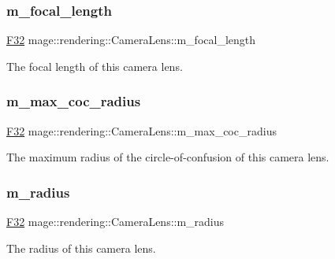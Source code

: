 \subsubsection{\texorpdfstring{m\+\_\+focal\+\_\+length}{m\_focal\_length}}
{\footnotesize\ttfamily \hyperlink{namespacemage_aa97e833b45f06d60a0a9c4fc22ae02c0}{F32} mage\+::rendering\+::\+Camera\+Lens\+::m\+\_\+focal\+\_\+length\hspace{0.3cm}{\ttfamily [private]}}

The focal length of this camera lens. \hypertarget{classmage_1_1rendering_1_1_camera_lens_a5c7880aabfbe08addb1fcaf9ac5ff940}{}\label{classmage_1_1rendering_1_1_camera_lens_a5c7880aabfbe08addb1fcaf9ac5ff940} 
\subsubsection{\texorpdfstring{m\+\_\+max\+\_\+coc\+\_\+radius}{m\_max\_coc\_radius}}
{\footnotesize\ttfamily \hyperlink{namespacemage_aa97e833b45f06d60a0a9c4fc22ae02c0}{F32} mage\+::rendering\+::\+Camera\+Lens\+::m\+\_\+max\+\_\+coc\+\_\+radius\hspace{0.3cm}{\ttfamily [private]}}

The maximum radius of the circle-\/of-\/confusion of this camera lens. \hypertarget{classmage_1_1rendering_1_1_camera_lens_ac93ec7ffd20ce31ad9707f700a99dc12}{}\label{classmage_1_1rendering_1_1_camera_lens_ac93ec7ffd20ce31ad9707f700a99dc12} 
\subsubsection{\texorpdfstring{m\+\_\+radius}{m\_radius}}
{\footnotesize\ttfamily \hyperlink{namespacemage_aa97e833b45f06d60a0a9c4fc22ae02c0}{F32} mage\+::rendering\+::\+Camera\+Lens\+::m\+\_\+radius\hspace{0.3cm}{\ttfamily [private]}}

The radius of this camera lens. 